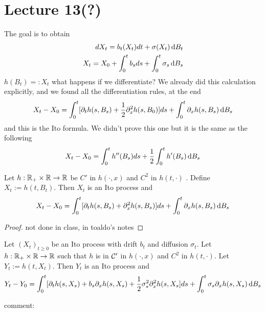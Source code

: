 \section{Lecture 13(?)}

The goal is to obtain 
\begin{equation}
    \begin{split}
        dX_t= b_t(X_t) dt + \sigma (X_t)\mathop{}\!\mathrm{d} B_t\\
        X_t = X_0 + \int_0^t b_s ds + \int_0^t \sigma_s \mathop{}\!\mathrm{d} B_s
    \end{split}
\end{equation}
$h(B_t)=: X_t$ what happens if we differentiate? We already did this calculation explicitly, and we found all the differentiation rules, at the end 
\begin{equation*}
	X_t -X_0 = \int_0^t [\partial_t h(s, B_s)+ \frac{1}{2} \partial^2_x h(s, B_0)]ds + \int_0^t \partial_x  h(s, B_s) \mathop{}\!\mathrm{d} B_s
\end{equation*}
and this is the Ito formula. We didn't prove this one but it is the same as the following 
\begin{equation*}
	X_t-X_0 = \int_0^t h''(B_s)ds + \frac{1}{2}\int_0^t h'(B_s)\mathop{}\!\mathrm{d} B_s
\end{equation*}
\begin{Th}
	Let $h: \mathbb{R}_+ \times \mathbb{R} \to \mathbb{R} $ be $C'$ in $h(\cdot, x)$ and $C^2$ in  $h(t,\cdot)$ . Define $X_t:=h(t,B_t)$. Then $X_t$ is an Ito process and 
	\begin{equation*}
			X_t -X_0 = \int_0^t [\partial_t h(s, B_s)+ \partial^2_x h(s, B_s)]ds + \int_0^t \partial_x  h(s, B_s) \mathop{}\!\mathrm{d} B_s 
	\end{equation*}
\end{Th}
\begin{proof}
	not done in class, in toaldo's notes 
\end{proof}
\begin{Th}
	Let $(X_t)_{t\geq 0}$ be an Ito process with drift $b_t$ and diffusion $\sigma_t$. Let $h: \mathbb{R}_+ \times \mathbb{R} \to \mathbb{R}$ such that $h$ is in $\mathcal{C}'$ in $h(\cdot, x)$ and $C^2$ in  $h(t,\cdot)$. Let $Y_t:= h(t, X_t)$. Then $Y_t$ is an Ito process and 
	\begin{equation*}
		Y_t -Y_0 = \int_0^t [\partial_t h(s, X_s)+ b_s \partial_x h(s, X_s)+ \frac{1}{2}\sigma^2 _s \partial^2_x h(s, X_s]ds + \int_0^t \sigma_s \partial_x  h(s, X_s) \mathop{}\!\mathrm{d} B_s 
	\end{equation*}
\end{Th}
comment: \\
